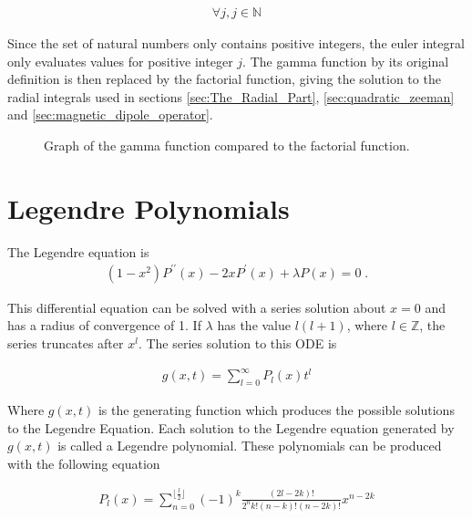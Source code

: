         \begin{align}
            \forall j, j\in \mathbb{N}
        \end{align}

        \noindent Since the set of natural numbers only contains positive integers, the euler integral only evaluates values for positive integer $j$. The gamma function by its original definition is then replaced by the factorial function, giving the solution to the radial integrals used in sections \ref{sec:The_Radial_Part}, \ref{sec:quadratic_zeeman} and \ref{sec:magnetic_dipole_operator}. 

        \begin{figure}[ht!]
            \centering
            \resizebox{0.8\linewidth}{!}{}
            \caption{Graph of the gamma function compared to the factorial function.}
            \label{img:Gamma_fn_graph}
        \end{figure}

    \section{Legendre Polynomials} \label{sec:Legendre_Polynomial}
        The Legendre equation is 
        \begin{align}
            (1 - x^2)P^{\prime \prime}(x) -2xP^\prime(x) + \lambda P(x) = 0\;.
        \end{align}

        \noindent This differential equation can be solved with a series solution about $x = 0$ and has a radius of convergence of 1. If $\lambda$ has the value $l(l+1)$, where $l \in \mathbb{Z}$, the series truncates after $x^{l}$. The series solution to this ODE is 

        \begin{align}
            g(x, t) = \sum_{l = 0}^\infty P_l(x) t^l 
        \end{align}

        \noindent Where $g(x, t)$ is the generating function which produces the possible solutions to the Legendre Equation. Each solution to the Legendre equation generated by $g(x, t)$ is called a Legendre polynomial. These polynomials can be produced with the following equation

        \begin{align}
            P_l(x) = \sum_{n = 0}^{\lfloor \frac{l}{2} \rfloor} (-1)^k \frac{(2l - 2k)!}{2^n k! (n - k)!(n - 2k)!}x^{n-2k}
        \end{align}

